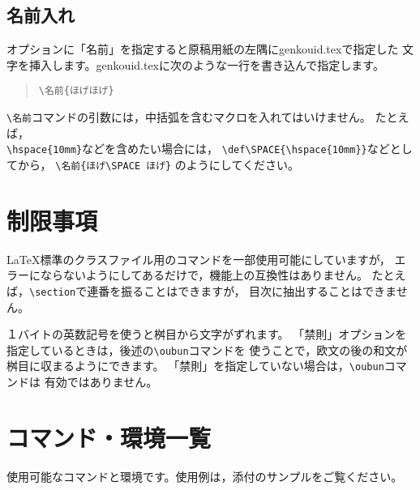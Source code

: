 \documentclass{jarticle}
\begin{document}
\subsection{名前入れ}
オプションに「名前」を指定すると原稿用紙の左隅にgenkouid.texで指定した
文字を挿入します。genkouid.texに次のような一行を書き込んで指定します。

\begin{verse}
    \verb+\名前{ほげほげ}+
\end{verse}

\verb+\名前+コマンドの引数には，中括弧を含むマクロを入れてはいけません。
たとえば，\\ \verb+\hspace{10mm}+などを含めたい場合には，
\verb+\def\SPACE{\hspace{10mm}}+などとしてから，
\verb+\名前{ほげ\SPACE ほげ}+
のようにしてください。

\section{制限事項}
\LaTeX{}標準のクラスファイル用のコマンドを一部使用可能にしていますが，
エラーにならないようにしてあるだけで，機能上の互換性はありません。
たとえば，\verb+\section+で連番を振ることはできますが，
目次に抽出することはできません。

１バイトの英数記号を使うと桝目から文字がずれます。
「禁則」オプションを指定しているときは，後述の\verb+\oubun+コマンドを
使うことで，欧文の後の和文が桝目に収まるようにできます。
「禁則」を指定していない場合は，\verb+\oubun+コマンドは
有効ではありません。


\section{コマンド・環境一覧}
使用可能なコマンドと環境です。使用例は，添付のサンプルをご覧ください。
\end{document}
